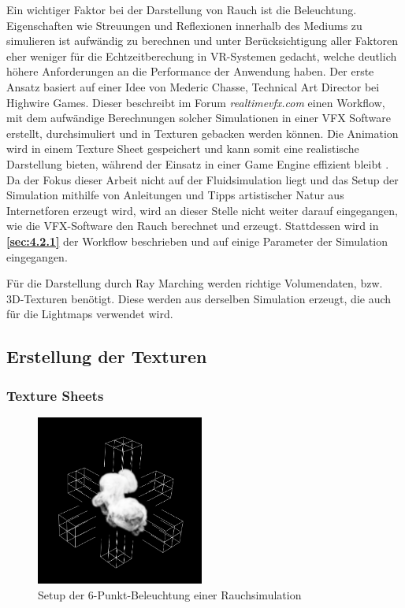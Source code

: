 Ein wichtiger Faktor bei der Darstellung von Rauch ist die Beleuchtung. Eigenschaften wie Streuungen und Reflexionen innerhalb des Mediums zu simulieren ist
aufwändig zu berechnen und unter Berücksichtigung aller Faktoren eher weniger für die Echtzeitberechung in VR-Systemen gedacht, welche deutlich höhere Anforderungen an die Performance der Anwendung
haben. Der erste Ansatz basiert auf einer Idee von Mederic Chasse, Technical Art Director  bei Highwire Games.
Dieser beschreibt im Forum \textit{realtimevfx.com} einen Workflow, mit dem aufwändige Berechnungen solcher Simulationen in einer VFX Software erstellt, durchsimuliert und in Texturen gebacken
werden können.
Die Animation wird in einem Texture Sheet gespeichert und kann somit eine realistische Darstellung bieten, während der Einsatz in einer Game Engine effizient bleibt \parencite{Chasse2018}.
Da der Fokus dieser Arbeit nicht auf der Fluidsimulation liegt und das Setup der Simulation mithilfe von Anleitungen
und Tipps artistischer Natur aus Internetforen erzeugt wird, wird an dieser Stelle nicht weiter darauf eingegangen, wie die VFX-Software den Rauch berechnet und erzeugt.
Stattdessen wird in \textbf{\autoref{sec:4.2.1}} der Workflow beschrieben und auf einige Parameter der Simulation eingegangen.

Für die Darstellung durch Ray Marching werden richtige Volumendaten, bzw. 3D-Texturen benötigt. Diese werden aus derselben Simulation erzeugt, die auch für die Lightmaps verwendet wird.




\subsection{Erstellung der Texturen}
\label{sec:4.2}


\subsubsection{Texture Sheets}
\label{sec:4.2.1}
\begin{figure}[h!]
	\includegraphics[width=0.49\textwidth]{Grafiken/Implementation/Lightmaps/Smoke_LightSetup.png}
	\centering
	\begin{footnotesize}
		\caption{Setup der 6-Punkt-Beleuchtung einer Rauchsimulation}
		\label{fig:lightSetup}
	\end{footnotesize}
\end{figure}

